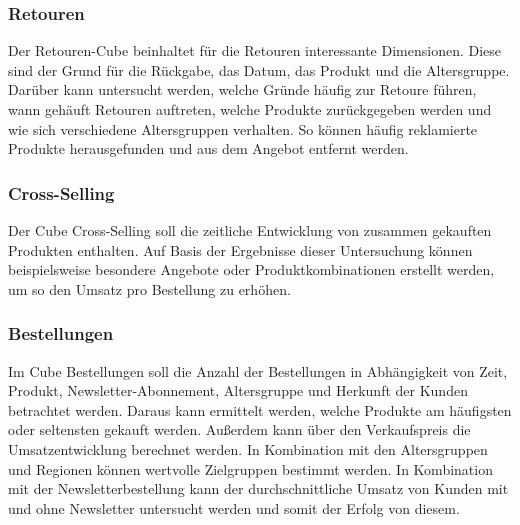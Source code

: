 \subsubsection*{Retouren}
\begin{figure}[htbp] 
  \centering
     
\end{figure}

Der Retouren-Cube beinhaltet für die Retouren interessante Dimensionen. Diese sind der Grund für die Rückgabe, das Datum, das Produkt und die Altersgruppe. Darüber kann untersucht werden, welche Gründe häufig zur Retoure führen, wann gehäuft Retouren auftreten, welche Produkte zurückgegeben werden und wie sich verschiedene Altersgruppen verhalten. So können häufig reklamierte Produkte herausgefunden und aus dem Angebot entfernt werden.

\vspace{11cm}

\subsubsection*{Cross-Selling}
\begin{figure}[htbp] 
  \centering
     
\end{figure}

Der Cube Cross-Selling soll die zeitliche Entwicklung von zusammen gekauften Produkten enthalten.  Auf Basis der Ergebnisse dieser Untersuchung können beispielsweise besondere Angebote oder Produktkombinationen erstellt werden, um so den Umsatz pro Bestellung zu erhöhen.

\subsubsection*{Bestellungen}
\begin{figure}[htbp] 
  \centering
     
\end{figure}

Im Cube Bestellungen soll die Anzahl der Bestellungen in Abhängigkeit von Zeit, Produkt, Newsletter-Abonnement, Altersgruppe und Herkunft der Kunden betrachtet werden. Daraus kann ermittelt werden, welche Produkte am häufigsten oder seltensten gekauft werden. Außerdem kann über den Verkaufspreis die Umsatzentwicklung berechnet werden. In Kombination mit den Altersgruppen und Regionen können wertvolle Zielgruppen bestimmt werden. In Kombination mit der Newsletterbestellung kann der durchschnittliche Umsatz von Kunden mit und ohne Newsletter untersucht werden und somit der Erfolg von diesem.

